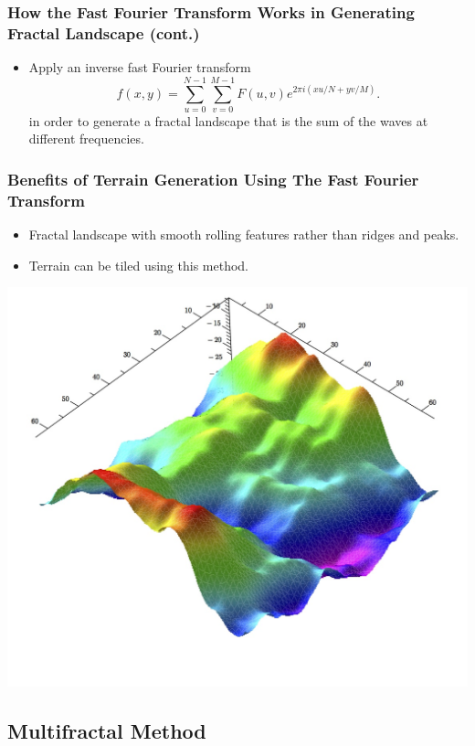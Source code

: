 \documentclass{beamer}
\begin{document}
\begin{frame}
\frametitle{How the Fast Fourier Transform Works in Generating Fractal Landscape (cont.)}
\begin{itemize}
\item Apply an inverse fast Fourier transform
$$f(x,y)=\displaystyle\sum\limits_{u=0}^{N-1} \displaystyle\sum\limits_{v=0}^{M-1} F(u,v)e^{2\pi i(xu/N+yv/M)}.$$ 
in order to generate a fractal landscape that is the sum of the waves at different frequencies. 
\end{itemize}
\end{frame}

\begin{frame}
\frametitle{Benefits of Terrain Generation Using The Fast Fourier Transform}
\begin{itemize}
\item Fractal landscape with smooth rolling features rather than ridges and peaks.
\item Terrain can be tiled using this method.
\end{itemize}
\begin{center}
\includegraphics[scale=0.3]{FourierLandscape.jpg}

\end{center}
\end{frame}

\subsection{Multifractal Method}
\end{document}

